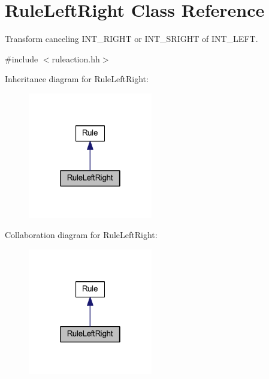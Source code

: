 \hypertarget{class_rule_left_right}{}\section{Rule\+Left\+Right Class Reference}
\label{class_rule_left_right}


Transform canceling I\+N\+T\+\_\+\+R\+I\+G\+HT or I\+N\+T\+\_\+\+S\+R\+I\+G\+HT of I\+N\+T\+\_\+\+L\+E\+FT.  




{\ttfamily \#include $<$ruleaction.\+hh$>$}



Inheritance diagram for Rule\+Left\+Right\+:
\nopagebreak
\begin{figure}[H]
\begin{center}
\leavevmode
\includegraphics[width=154pt]{class_rule_left_right__inherit__graph}
\end{center}
\end{figure}


Collaboration diagram for Rule\+Left\+Right\+:
\nopagebreak
\begin{figure}[H]
\begin{center}
\leavevmode
\includegraphics[width=154pt]{class_rule_left_right__coll__graph}
\end{center}
\end{figure}
